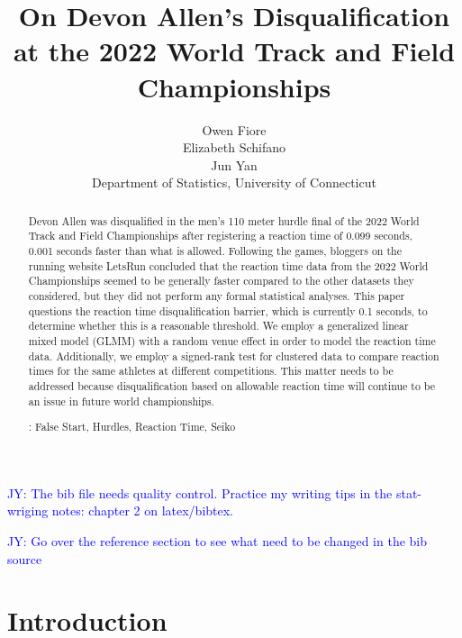 \documentclass[12pt, letterpaper, titlepage]{article}
\title{On Devon Allen's Disqualification at the 2022 World Track and Field 
Championships}
\author{Owen Fiore\\
  Elizabeth Schifano\\
  Jun Yan\\[1ex]
  Department of Statistics, University of Connecticut\\
}
\date{}
\newcommand{\jy}[1]{\textcolor{blue}{JY: #1}}
\begin{document}
\maketitle

\begin{abstract}
Devon Allen was disqualified in the men's 110 meter hurdle final of the 2022
World Track and Field Championships after registering a reaction time of 0.099 
seconds, 0.001 seconds faster than what is allowed. Following the games, 
bloggers on the running website LetsRun concluded that the reaction time data 
from the 2022 World Championships seemed to be generally faster compared to the 
other datasets they considered, but they did not perform any formal 
statistical analyses. This paper questions the reaction time 
disqualification barrier, which is currently 0.1 seconds, to determine whether 
this is a reasonable threshold. We employ a generalized linear mixed model 
(GLMM) with a random venue effect in order to  model the reaction time data. 
Additionally, we employ a signed-rank test for clustered data to 
compare reaction times for the same athletes at different competitions. This 
matter needs to be addressed because disqualification based on allowable 
reaction time will continue to be an issue in future world championships.




\bigskip\noindent{}:
False Start, Hurdles, Reaction Time, Seiko 

\end{abstract}

\doublespace

\jy{The bib file needs quality control. Practice my writing tips in the
  stat-wriging notes: chapter 2 on latex/bibtex.}

\jy{Go over the reference section to see what need to be changed in the bib source}

\section{Introduction}
\label{sec:intro}
\end{document}
